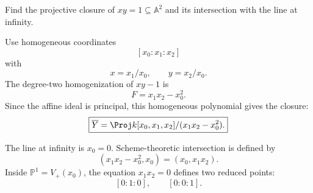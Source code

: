 \begin{problem}\label{prob:vi37-06}
Find the projective closure of \(xy=1\subseteq\mathbb A^2\) and its intersection with the line at infinity.
\end{problem}

\ifdefined\FullProblemDossiers
\begin{solution}
Use homogeneous coordinates
\[
[x_0:x_1:x_2]
\]
with
\[
x=x_1/x_0,\qquad y=x_2/x_0.
\]
The degree-two homogenization of \(xy-1\) is
\[
F=x_1x_2-x_0^2.
\]
Since the affine ideal is principal, this homogeneous polynomial gives the closure:
\[
\boxed{
\overline Y
=
\Proj k[x_0,x_1,x_2]/(x_1x_2-x_0^2).
}
\]

The line at infinity is \(x_0=0\). Scheme-theoretic intersection is defined by
\[
(x_1x_2-x_0^2,x_0)
=
(x_0,x_1x_2).
\]
Inside \(\mathbb P^1=V_+(x_0)\), the equation \(x_1x_2=0\) defines two reduced points:
\[
\boxed{
[0:1:0],\qquad[0:0:1].
}
\]
\end{solution}
\fi
